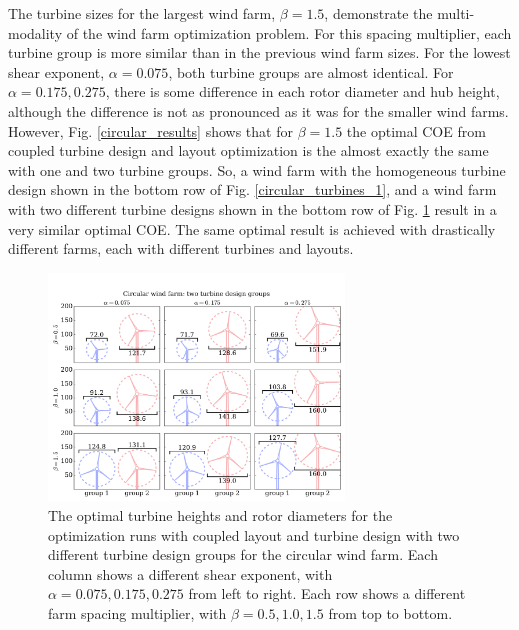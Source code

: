 The turbine sizes for the largest wind farm, $\beta=1.5$, demonstrate the multi-modality of the wind farm optimization problem. For this spacing multiplier, each turbine group is more similar than in the previous wind farm sizes. For the lowest shear exponent, $\alpha=0.075$, both turbine groups are almost identical. For $\alpha=0.175,0.275$, there is some difference in each rotor diameter and hub height, although the difference is not as pronounced as it was for the smaller wind farms. However, Fig. \ref{circular_results} shows that for $\beta=1.5$ the optimal COE from coupled turbine design and layout optimization is the almost exactly the same with one and two turbine groups. So, a wind farm with the homogeneous turbine design shown in the bottom row of Fig. \ref{circular_turbines_1}, and a wind farm with two different turbine designs shown in the bottom row of Fig. \ref{circular_turbines} result in a very similar optimal COE. The same optimal result is achieved with drastically different farms, each with different turbines and layouts.  

\begin{figure}[htbp]
  \centering
  \includegraphics[trim={0.5cm 0.3cm 0.3cm 2.75cm},clip,width=0.7\textwidth]{Figures/turbineSizesCircular_2.pdf}
  \caption{\label{circular_turbines} The optimal turbine heights and rotor diameters for the optimization runs with coupled layout and turbine design with two different turbine design groups for the circular wind farm. Each column shows a different shear exponent, with $\alpha=0.075,0.175,0.275$ from left to right. Each row shows a different farm spacing multiplier, with $\beta=0.5,1.0,1.5$ from top to bottom.}
\end{figure}


